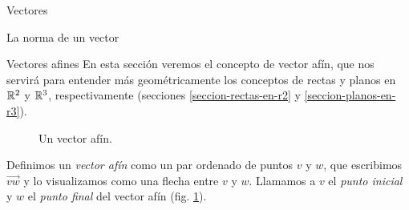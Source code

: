 \begin{chapter}{Vectores}
\begin{section}{La norma de un vector}


    \begin{section}{Vectores afines}\label{seccion-vectores-afines}
        En  esta sección veremos el concepto de vector afín, que nos servirá  para entender más geométricamente los conceptos de rectas y planos en $\mathbb R^2$ y $\mathbb R^3$,  respectivamente (secciones \ref{seccion-rectas-en-r2} y \ref{seccion-planos-en-r3}). 
        \begin{figure}[h]
        	\centering
            \caption{Un vector afín.}
            \label{fig-vector-afin}
        \end{figure}
        Definimos un \textit{vector afín} como un par ordenado de puntos  $v$ y $w$, que escribimos $\overrightarrow{vw}$ y lo visualizamos como una flecha entre $v$ y $w$. Llamamos a $v$ el \textit{punto inicial} y $w$ el \textit{punto final} del vector afín (fig. \ref{fig-vector-afin}).
        
        
        

\end{section}
\end{section}
\end{chapter}
